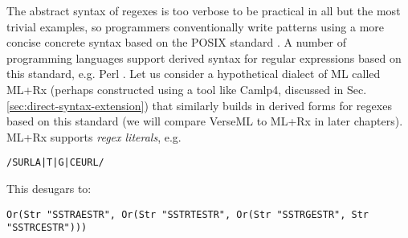 The abstract syntax of regexes is too verbose to be practical  in all but the most trivial examples, so programmers conventionally write patterns using a more concise concrete syntax based on the POSIX standard \cite{STD95954}. A number of programming languages support derived syntax for regular expressions based on this standard, e.g. Perl . Let us consider a hypothetical dialect of ML called ML+Rx (perhaps constructed using a tool like Camlp4, discussed in Sec. \ref{sec:direct-syntax-extension}) that similarly builds in derived forms for regexes based on this standard (we will compare VerseML to ML+Rx in later chapters). ML+Rx supports \emph{regex literals}, e.g.
\begin{lstlisting}[numbers=none]
/SURLA|T|G|CEURL/
\end{lstlisting}
This desugars to:
\begin{lstlisting}[numbers=none]
Or(Str "SSTRAESTR", Or(Str "SSTRTESTR", Or(Str "SSTRGESTR", Str "SSTRCESTR")))
\end{lstlisting}

